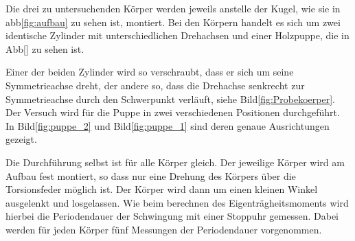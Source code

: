 Die drei zu untersuchenden Körper werden jeweils anstelle der Kugel, wie sie in abb\ref{fig:aufbau} zu sehen ist, montiert.
Bei den Körpern handelt es sich um zwei identische Zylinder mit unterschiedlichen Drehachsen und einer Holzpuppe, die in Abb[]
zu sehen ist. 

Einer der beiden Zylinder wird so verschraubt, dass er sich um seine Symmetrieachse dreht, der andere so, dass die Drehachse senkrecht
zur Symmetrieachse durch den Schwerpunkt verläuft, siehe Bild\ref{fig:Probekoerper}. Der Versuch wird für die Puppe in zwei 
verschiedenen Positionen durchgeführt. In Bild\ref{fig:puppe_2} und Bild\ref{fig:puppe_1} sind deren genaue Ausrichtungen gezeigt. 

Die Durchführung selbst ist für alle Körper gleich. Der jeweilige Körper wird am Aufbau fest montiert, so dass nur eine Drehung des 
Körpers über die Torsionsfeder möglich ist. Der Körper wird dann um einen kleinen Winkel ausgelenkt und losgelassen. Wie beim berechnen
des Eigenträgheitsmoments wird hierbei die Periodendauer der Schwingung mit einer Stoppuhr gemessen. Dabei werden für jeden Körper 
fünf Messungen der Periodendauer vorgenommen. 


